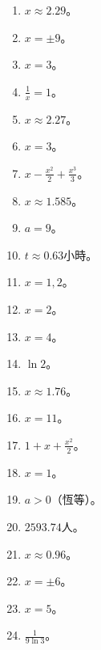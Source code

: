 \begin{enumerate}[label=\arabic*.]
    \item $x \approx 2.29$。
    \item $x = \pm 9$。
    \item $x = 3$。
    \item $\frac{1}{x} = 1$。
    \item $x \approx 2.27$。
    \item $x = 3$。
    \item $x - \frac{x^2}{2} + \frac{x^3}{3}$。
    \item $x \approx 1.585$。
    \item $a = 9$。
    \item $t \approx 0.63$小時。
    \item $x = 1, 2$。
    \item $x = 2$。
    \item $x = 4$。
    \item $\ln 2$。
    \item $x \approx 1.76$。
    \item $x = 11$。
    \item $1 + x + \frac{x^2}{2}$。
    \item $x = 1$。
    \item $a > 0$（恆等）。
    \item $2593.74$人。
    \item $x \approx 0.96$。
    \item $x = \pm 6$。
    \item $x = 5$。
    \item $\frac{1}{9 \ln 3}$。
\end{enumerate}

